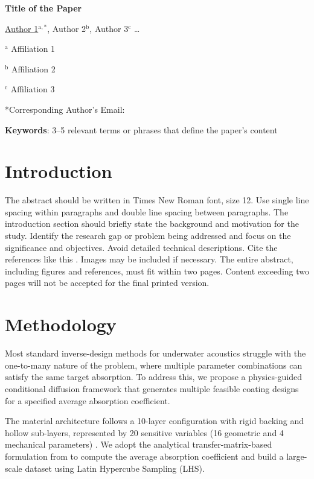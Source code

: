 \documentclass[12pt]{article}
\begin{document}
\begin{center}
{\bfseries\fontsize{12}{14}\selectfont Title of the Paper}

{\fontsize{12}{14}\selectfont
\uline{Author 1}$^{\text{a},*}$, Author 2$^{\text{b}}$, Author 3$^{\text{c}}$ \ldots}

{\fontsize{10}{14}\selectfont
$^{\text{a}}$ Affiliation 1

$^{\text{b}}$ Affiliation 2

$^{\text{c}}$ Affiliation 3
}
\end{center}

*Corresponding Author's Email:
\par\vspace{0.3\baselineskip}
\textbf{Keywords}: 3--5 relevant terms or phrases that define the paper's content

\section*{Introduction}
The abstract should be written in Times New Roman font, size 12. Use single line spacing within paragraphs and double line spacing between paragraphs. The introduction section should briefly state the background and motivation for the study. Identify the research gap or problem being addressed and focus on the significance and objectives. Avoid detailed technical descriptions. Cite the references like this \cite{ref1}. Images may be included if necessary. The entire abstract, including figures and references, must fit within two pages. Content exceeding two pages will not be accepted for the final printed version.

\section*{Methodology}
Most standard inverse-design methods for underwater acoustics struggle with the one-to-many nature of the problem, where multiple parameter combinations can satisfy the same target absorption. To address this, we propose a physics-guided conditional diffusion framework that generates multiple feasible coating designs for a specified average absorption coefficient.

The material architecture follows a 10-layer configuration with rigid backing and hollow sub-layers, represented by 20 sensitive variables (16 geometric and 4 mechanical parameters) \cite{ref1}. We adopt the analytical transfer-matrix-based formulation from \cite{ref1} to compute the average absorption coefficient and build a large-scale dataset using Latin Hypercube Sampling (LHS).
\end{document}
